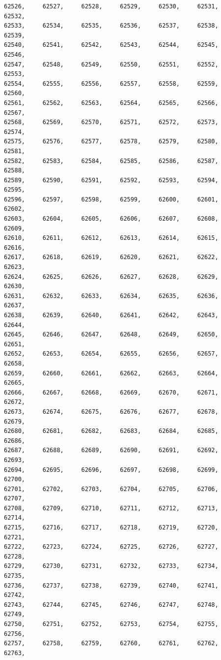 \documentclass[a4paper,11pt]{report}
\begin{document}
\begin{verbatim}
62526,     62527,     62528,     62529,     62530,     62531,     62532,     
62533,     62534,     62535,     62536,     62537,     62538,     62539,     
62540,     62541,     62542,     62543,     62544,     62545,     62546,     
62547,     62548,     62549,     62550,     62551,     62552,     62553,     
62554,     62555,     62556,     62557,     62558,     62559,     62560,     
62561,     62562,     62563,     62564,     62565,     62566,     62567,     
62568,     62569,     62570,     62571,     62572,     62573,     62574,     
62575,     62576,     62577,     62578,     62579,     62580,     62581,     
62582,     62583,     62584,     62585,     62586,     62587,     62588,     
62589,     62590,     62591,     62592,     62593,     62594,     62595,     
62596,     62597,     62598,     62599,     62600,     62601,     62602,     
62603,     62604,     62605,     62606,     62607,     62608,     62609,     
62610,     62611,     62612,     62613,     62614,     62615,     62616,     
62617,     62618,     62619,     62620,     62621,     62622,     62623,     
62624,     62625,     62626,     62627,     62628,     62629,     62630,     
62631,     62632,     62633,     62634,     62635,     62636,     62637,     
62638,     62639,     62640,     62641,     62642,     62643,     62644,     
62645,     62646,     62647,     62648,     62649,     62650,     62651,     
62652,     62653,     62654,     62655,     62656,     62657,     62658,     
62659,     62660,     62661,     62662,     62663,     62664,     62665,     
62666,     62667,     62668,     62669,     62670,     62671,     62672,     
62673,     62674,     62675,     62676,     62677,     62678,     62679,     
62680,     62681,     62682,     62683,     62684,     62685,     62686,     
62687,     62688,     62689,     62690,     62691,     62692,     62693,     
62694,     62695,     62696,     62697,     62698,     62699,     62700,     
62701,     62702,     62703,     62704,     62705,     62706,     62707,     
62708,     62709,     62710,     62711,     62712,     62713,     62714,     
62715,     62716,     62717,     62718,     62719,     62720,     62721,     
62722,     62723,     62724,     62725,     62726,     62727,     62728,     
62729,     62730,     62731,     62732,     62733,     62734,     62735,     
62736,     62737,     62738,     62739,     62740,     62741,     62742,     
62743,     62744,     62745,     62746,     62747,     62748,     62749,     
62750,     62751,     62752,     62753,     62754,     62755,     62756,     
62757,     62758,     62759,     62760,     62761,     62762,     62763,     

\end{verbatim}
\end{document}
